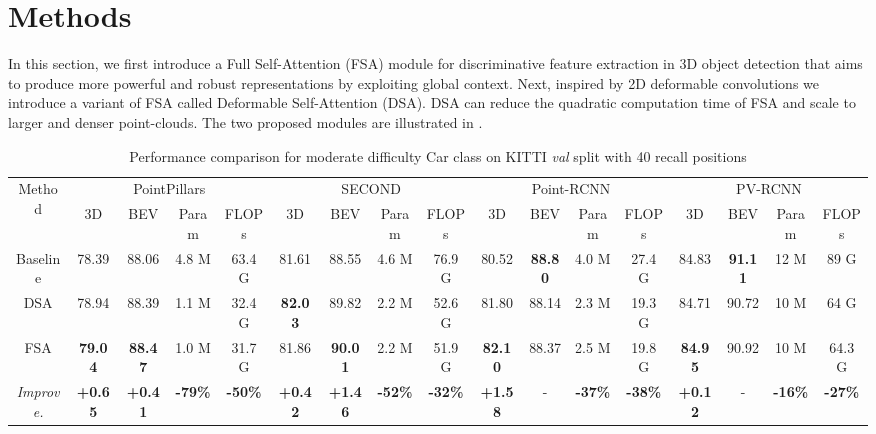 \documentclass[10pt,twocolumn,letterpaper]{article}
\newcommand{\improv}[1]{\color[rgb]{0,0.8,0}\textbf{#1}}
\begin{document}
\section{Methods}
In this section, we first introduce a Full Self-Attention (FSA) module for discriminative feature extraction in 3D object detection that aims to produce more powerful and robust representations by exploiting global context. Next, inspired by 2D deformable convolutions \cite{DCN} we introduce a variant of FSA called Deformable Self-Attention (DSA). DSA can reduce the quadratic computation time of FSA and scale to larger and denser point-clouds.
The two proposed modules are illustrated in .

\setlength{\tabcolsep}{1pt}
\begin{table*}[t]
\footnotesize
    \centering
    \begin{tabular*}{\textwidth}{ @{\extracolsep{\fill}}c|cccc|cccc|cccc|cccc}
        \hline
        \multirow{2}{*}{Method} & 
        \multicolumn{4}{c|}{PointPillars \cite{pointpillars}} &
        \multicolumn{4}{c|}{SECOND \cite{SECOND}} &
        \multicolumn{4}{c|}{Point-RCNN \cite{PointRCNN}} &
        \multicolumn{4}{c}{PV-RCNN \cite{PVRCNN}} \\
        & 3D & BEV & Param & FLOPs &
        3D & BEV & Param & FLOPs &
        3D & BEV & Param & FLOPs &
        3D & BEV & Param & FLOPs\\
        \hline
        Baseline &
        78.39 & 88.06 & 4.8 M & 63.4 G & 
        81.61 & 88.55 & 4.6 M & 76.9 G & 
        80.52 & \textbf{88.80} & 4.0 M & 27.4 G &
        84.83 & \textbf{91.11} & 12 M & 89 G \\
        
        DSA &
        78.94 & 88.39 & 1.1 M & 32.4 G &
        \textbf{82.03} & 89.82 & 2.2 M & 52.6 G &
        81.80 & 88.14 & 2.3 M & 19.3 G &
        84.71 & 90.72 & 10 M & 64 G \\
        
        FSA &
        \textbf{79.04} & \textbf{88.47} & 1.0 M & 31.7 G &
        81.86 & \textbf{90.01} & 2.2 M & 51.9 G &
        \textbf{82.10} & 88.37 & 2.5 M & 19.8 G &
        \textbf{84.95} & 90.92 & 10 M & 64.3 G \\
        \hline
        
        \textit{Improve.} &
        \improv{+0.65} & \improv{+0.41} & \improv{-79\%} & \improv{-50\%} &
        \improv{+0.42} & \improv{+1.46} & \improv{-52\%} & \improv{-32\%} &
        \improv{+1.58} & - & \improv{-37\%} & \improv{-38\%} &
        \improv{+0.12} & - & \improv{-16\%} & \improv{-27\%}
        \\
        \hline
    \end{tabular*}
    \caption{Performance comparison for moderate difficulty Car class on KITTI \textit{val} split with 40 recall positions}
    \label{tab:kitti_val_car}
    \vspace{-0.3cm}
\end{table*} 
\end{document}
